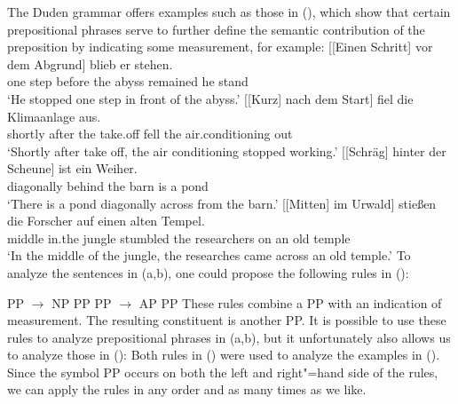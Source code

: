 The Duden grammar \citep[\S 1300]{Duden2005-Authors} offers examples such as those in (), which show that certain prepositional phrases
serve to further define the semantic contribution of the preposition by indicating some measurement,
for example:
\eal
\ex\label{Beispiel-Schritt-vor-dem-Abgrund} 
\gll {}[[Einen Schritt] vor dem Abgrund] blieb er stehen.\\
	 {}\spacebr{}\spacebr{}one step before the abyss remained he stand\\
\glt `He stopped one step in front of the abyss.'
\ex 
\gll {}[[Kurz] nach dem Start] fiel die Klimaanlage aus.\\
	 {}\spacebr{}\spacebr{}shortly after the take.off fell the air.conditioning out\\
\glt `Shortly after take off, the air conditioning stopped working.'
\ex 
\gll {}[[Schräg] hinter der Scheune] ist ein Weiher.\\
	 {}\spacebr{}\spacebr{}diagonally behind the barn is a pond\\
\glt `There is a pond diagonally across from the barn.'
\ex 
\gll {}[[Mitten] im Urwald] stießen die Forscher auf einen alten Tempel.\\
	 {}\spacebr{}\spacebr{}middle in.the jungle stumbled the researchers on an old temple\\
\glt `In the middle of the jungle, the researches came across an old temple.'
\zl
To analyze the sentences in (a,b), one could propose the following rules in ():

\eal
\ex PP $\to$ NP PP
\ex PP $\to$ AP PP
\zl
These rules combine a PP with an indication of measurement. The resulting constituent is another PP. It is
possible to use these rules to analyze prepositional phrases in (a,b), but it unfortunately also allows
us to analyze those in ():
\eal
{}
\zl
Both rules in () were used to analyze the examples in (). Since the symbol PP occurs on both the left 
and right"=hand side of the rules, we can apply the rules in any order and as many times as we like.

